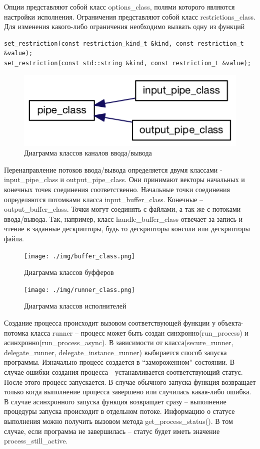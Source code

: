 \documentclass{imcs}
\begin{document}
Опции представляют собой класс options\_class, полями которого являются настройки исполнения.
Ограничения представляют собой класс restrictions\_class. Для изменения какого-либо ограничения необходимо вызвать одну из функций
\begin{lstlisting}
set_restriction(const restriction_kind_t &kind, const restriction_t &value);
set_restriction(const std::string &kind, const restriction_t &value);
\end{lstlisting}
\FloatBarrier 
\begin{figure}[htb]
\centering
\includegraphics{./img/pipe_class.png}
\caption{Диаграмма классов каналов ввода/вывода}
\label{pipe_class}
\end{figure}
\FloatBarrier

Перенаправление потоков ввода/вывода определяется двумя классами - input\_pipe\_class и output\_pipe\_class. Они принимают векторы начальных и конечных точек соединения соответственно. Начальные точки соединения определяются потомками класса input\_buffer\_class. Конечные – output\_buffer\_class. Точки могут соединять с файлами, а так же с потоками ввода/вывода. Так, например, класс handle\_buffer\_class отвечает за запись и чтение в заданные дескрипторы, будь то дескрипторы консоли или дескрипторы файла.
\FloatBarrier 
\begin{figure}[htb]
\centering
\texttt{[image: ./img/buffer\_class.png]}
\caption{Диаграмма классов буфферов}
\label{buffer_class}
\end{figure}
\begin{figure}[htb]
\centering
\texttt{[image: ./img/runner\_class.png]}
\caption{Диаграмма классов исполнителей}
\label{runner_class}
\end{figure}
\FloatBarrier
Создание процесса происходит вызовом соответствующей функции у объекта-потомка класса runner – процесс может быть создан синхронно(run\_process) и асинхронно(run\_process\_async). В зависимости от класса(secure\_runner, delegate\_runner, delegate\_instance\_runner) выбирается способ запуска программы. Изначально процесс создается в “замороженном” состоянии. В случае ошибки создания процесса - устанавливается соответствующий статус. После этого процесс запускается. В случае обычного запуска функция возвращает только когда выполнение процесса завершено или случилась какая-либо ошибка. В случае асинхронного запуска функция возвращает сразу – выполнение процедуры запуска происходит в отдельном потоке. 
Информацию о статусе выполнения можно получить вызовом метода get\_process\_status(). В том случае, если программа не завершилась – статус будет иметь значение process\_still\_active.
\end{document}
